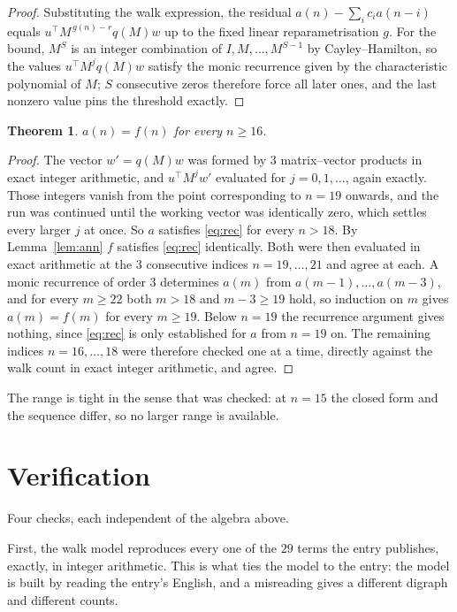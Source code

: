 \documentclass[11pt,a4paper]{article}
\theoremstyle{plain}
\newtheorem{theorem}{Theorem}
\theoremstyle{definition}
\begin{document}
\begin{proof}
Substituting the walk expression, the residual $a(n)-\sum_ic_ia(n-i)$ equals
$u^{\!\top}M^{\,g(n)-r}q(M)w$ up to the fixed linear reparametrisation $g$. For the bound,
$M^{S}$ is an integer combination of $I,M,\dots,M^{S-1}$ by Cayley--Hamilton, so the values
$u^{\!\top}M^{j}q(M)w$ satisfy the monic recurrence given by the characteristic polynomial of
$M$; $S$ consecutive zeros therefore force all later ones, and the last nonzero value pins the
threshold exactly.
\end{proof}

\begin{theorem}
$a(n)=f(n)$ for every $n\ge16$.
\end{theorem}

\begin{proof}
The vector $w'=q(M)w$ was formed by $3$ matrix--vector products in exact integer
arithmetic, and $u^{\!\top}M^{j}w'$ evaluated for $j=0,1,\dots$, again exactly. Those integers
vanish from the point corresponding to $n=19$ onwards, and the run was continued until the
working vector was identically zero, which settles every larger $j$ at once. So $a$ satisfies
\eqref{eq:rec} for every $n>18$. By Lemma~\ref{lem:ann} $f$ satisfies \eqref{eq:rec}
identically. Both were then evaluated in exact arithmetic at the $3$ consecutive indices
$n=19,\dots,21$ and agree at each. A monic recurrence of order $3$
determines $a(m)$ from $a(m-1),\dots,a(m-3)$, and for every $m\ge22$ both
$m>18$ and $m-3\ge19$ hold, so induction on $m$ gives $a(m)=f(m)$ for every
$m\ge19$.
Below $n=19$ the recurrence argument gives nothing, since \eqref{eq:rec} is only
established for $a$ from $n=19$ on. The remaining indices $n=16,\dots,18$ were
therefore checked one at a time, directly against the walk count in exact integer arithmetic,
and agree.
\end{proof}

The range is tight in the sense that was checked: at $n=15$ the closed form and the sequence differ, so no larger range is available.

\section{Verification}

Four checks, each independent of the algebra above.

First, the walk model reproduces every one of the $29$ terms the entry publishes,
exactly, in integer arithmetic. This is what ties the model to the entry: the model is built
by reading the entry's English, and a misreading gives a different digraph and different
counts.
\end{document}
